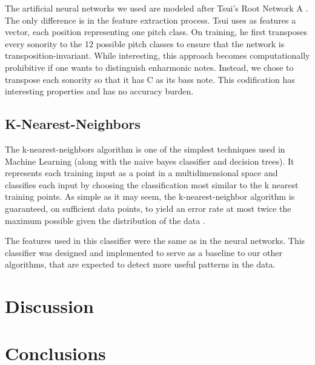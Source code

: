 \documentclass{article}
\begin{document}
The artificial neural networks we used are modeled after Tsui's Root
Network A \cite{tsui:harmonic}. The only difference is in the feature
extraction process. Tsui \cite{tsui:harmonic} uses as features a
vector, each position representing one pitch class. On training, he
first transposes every sonority to the 12 possible pitch classes to
ensure that the network is transposition-invariant. While interesting,
this approach becomes computationally prohibitive if one wants to
distinguish enharmonic notes. Instead, we chose to transpose each
sonority so that it has C as its bass note. This codification has
interesting properties and has no accuracy burden.

\subsection{K-Nearest-Neighbors}
\label{sec:knn}

The k-nearest-neighbors algorithm is one of the simplest techniques
used in Machine Learning (along with the naive bayes classifier and
decision trees). It represents each training input as a point in a
multidimensional space and classifies each input by choosing the
classification most similar to the k nearest training points. As
simple as it may seem, the k-nearest-neighbor algorithm is guaranteed,
on sufficient data points, to yield an error rate at most twice the
maximum possible given the distribution of the data
\cite{fix.ea:important}.

The features used in this classifier were the same as in the neural
networks. This classifier was designed and implemented to serve as a
baseline to our other algorithms, that are expected to detect more
useful patterns in the data.


\section{Discussion}
\label{sec:discussion}



\section{Conclusions}
\label{sec:conclusions}




\end{document}
